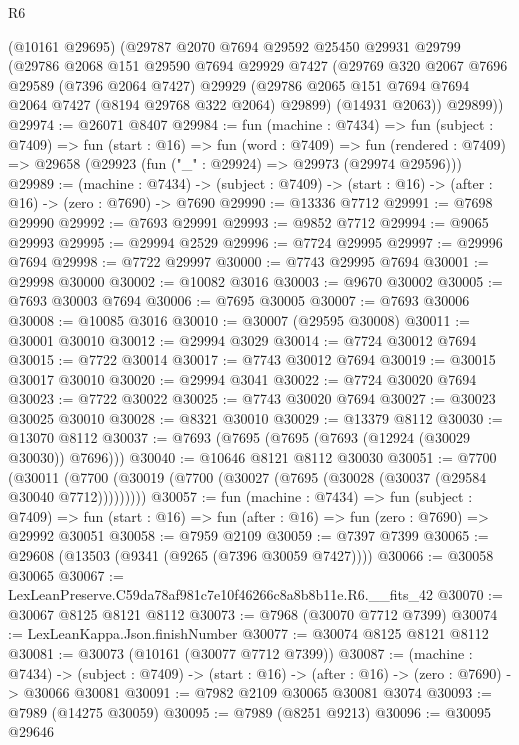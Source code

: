 \begin{lexlean}{R6}
\begin{coremodule}
    (@10161 @29695)
    (@29787
      @2070
      @7694
      @29592
      @25450
      @29931
      @29799
      (@29786
        @2068
        @151
        @29590
        @7694
        @29929
        @7427
        (@29769
          @320
          @2067
          @7696
          @29589
          (@7396 @2064 @7427)
          @29929
          (@29786 @2065 @151 @7694 @7694 @2064 @7427 (@8194 @29768 @322 @2064) @29899)
          (@14931 @2063))
        @29899))
@29974 := @26071 @8407
@29984 := fun (machine : @7434) =>
  fun (subject : @7409) =>
  fun (start : @16) =>
  fun (word : @7409) =>
  fun (rendered : @7409) => @29658 (@29923 (fun ("_" : @29924) => @29973 (@29974 @29596)))
@29989 := (machine : @7434) ->
  (subject : @7409) -> (start : @16) -> (after : @16) -> (zero : @7690) -> @7690
@29990 := @13336 @7712
@29991 := @7698 @29990
@29992 := @7693 @29991
@29993 := @9852 @7712
@29994 := @9065 @29993
@29995 := @29994 @2529
@29996 := @7724 @29995
@29997 := @29996 @7694
@29998 := @7722 @29997
@30000 := @7743 @29995 @7694
@30001 := @29998 @30000
@30002 := @10082 @3016
@30003 := @9670 @30002
@30005 := @7693 @30003 @7694
@30006 := @7695 @30005
@30007 := @7693 @30006
@30008 := @10085 @3016
@30010 := @30007 (@29595 @30008)
@30011 := @30001 @30010
@30012 := @29994 @3029
@30014 := @7724 @30012 @7694
@30015 := @7722 @30014
@30017 := @7743 @30012 @7694
@30019 := @30015 @30017 @30010
@30020 := @29994 @3041
@30022 := @7724 @30020 @7694
@30023 := @7722 @30022
@30025 := @7743 @30020 @7694
@30027 := @30023 @30025 @30010
@30028 := @8321 @30010
@30029 := @13379 @8112
@30030 := @13070 @8112
@30037 := @7693 (@7695 (@7695 (@7693 (@12924 (@30029 @30030)) @7696)))
@30040 := @10646 @8121 @8112 @30030
@30051 := @7700
    (@30011 (@7700 (@30019 (@7700 (@30027 (@7695 (@30028 (@30037 (@29584 @30040 @7712)))))))))
@30057 := fun (machine : @7434) =>
  fun (subject : @7409) =>
  fun (start : @16) => fun (after : @16) => fun (zero : @7690) => @29992 @30051
@30058 := @7959 @2109
@30059 := @7397 @7399
@30065 := @29608 (@13503 (@9341 (@9265 (@7396 @30059 @7427))))
@30066 := @30058 @30065
@30067 := LexLeanPreserve.C59da78af981c7e10f46266c8a8b8b11e.R6.__fits_42
@30070 := @30067 @8125 @8121 @8112
@30073 := @7968 (@30070 @7712 @7399)
@30074 := LexLeanKappa.Json.finishNumber
@30077 := @30074 @8125 @8121 @8112
@30081 := @30073 (@10161 (@30077 @7712 @7399))
@30087 := (machine : @7434) ->
  (subject : @7409) -> (start : @16) -> (after : @16) -> (zero : @7690) -> @30066 @30081
@30091 := @7982 @2109 @30065 @30081 @3074
@30093 := @7989 (@14275 @30059)
@30095 := @7989 (@8251 @9213)
@30096 := @30095 @29646

\end{coremodule}
\end{lexlean}
